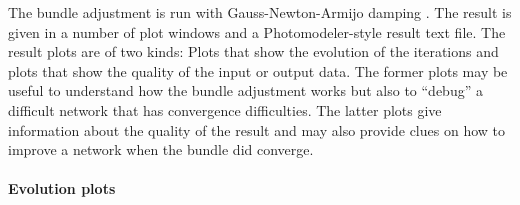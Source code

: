 \documentclass{article}
\begin{document}
The bundle adjustment is run with Gauss-Newton-Armijo damping
\citep{Borlin2013:Bundle}. The result is given in a number of plot
windows and a Photo\-modeler-style result text file. The result plots
are of two kinds: Plots that show the evolution of the iterations and
plots that show the quality of the input or output data. The former
plots may be useful to understand how the bundle adjustment works but
also to ``debug'' a difficult network that has convergence
difficulties. The latter plots give information about the quality of
the result and may also provide clues on how to improve a network when
the bundle did converge.

\paragraph{Evolution plots}
\end{document}
